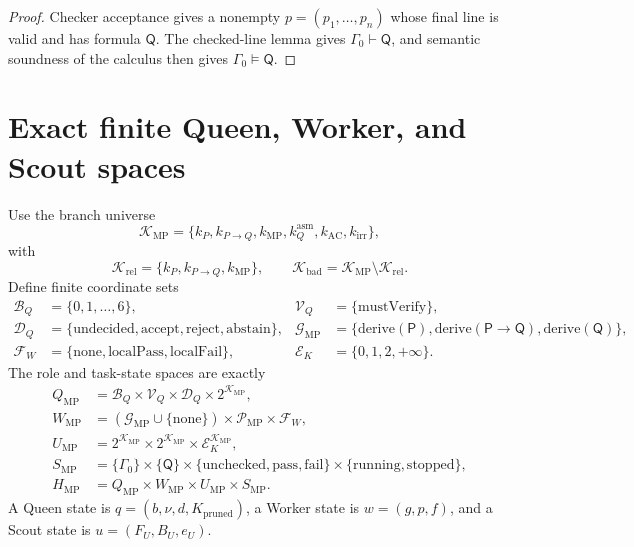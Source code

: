 \documentclass[11pt,oneside]{book}
\theoremstyle{remark}
\begin{document}
\begin{proof}
Checker acceptance gives a nonempty $p=(p_1,\ldots,p_n)$ whose final line is
valid and has formula $\mathsf Q$. The checked-line lemma gives
$\Gamma_0\vdash\mathsf Q$, and semantic soundness of the calculus then gives
$\Gamma_0\models\mathsf Q$.
\end{proof}

\section{Exact finite Queen, Worker, and Scout spaces}

Use the branch universe
\[
\mathcal K_{\mathrm{MP}}
=\{k_P,k_{P\to Q},k_{\mathrm{MP}},
k_Q^{\mathrm{asm}},k_{\mathrm{AC}},k_{\mathrm{irr}}\},
\]
with
\[
\mathcal K_{\mathrm{rel}}=\{k_P,k_{P\to Q},k_{\mathrm{MP}}\},
\qquad
\mathcal K_{\mathrm{bad}}
=\mathcal K_{\mathrm{MP}}\setminus\mathcal K_{\mathrm{rel}}.
\]
Define finite coordinate sets
\begin{align*}
\mathcal B_Q&=\{0,1,\ldots,6\},&
\mathcal V_Q&=\{\mathrm{mustVerify}\},\\
\mathcal D_Q&=\{\mathrm{undecided},\mathrm{accept},
\mathrm{reject},\mathrm{abstain}\},&
\mathcal G_{\mathrm{MP}}&=\{
\mathrm{derive}(\mathsf P),
\mathrm{derive}(\mathsf P\to\mathsf Q),
\mathrm{derive}(\mathsf Q)\},\\
\mathcal F_W&=\{\mathrm{none},\mathrm{localPass},\mathrm{localFail}\},&
\mathcal E_K&=\{0,1,2,+\infty\}.
\end{align*}
The role and task-state spaces are exactly
\begin{align*}
Q_{\mathrm{MP}}
&=\mathcal B_Q\times\mathcal V_Q\times\mathcal D_Q
\times2^{\mathcal K_{\mathrm{MP}}},\\
W_{\mathrm{MP}}
&=(\mathcal G_{\mathrm{MP}}\cup\{\mathrm{none}\})
\times\mathcal P_{\mathrm{MP}}\times\mathcal F_W,\\
U_{\mathrm{MP}}
&=2^{\mathcal K_{\mathrm{MP}}}
\times2^{\mathcal K_{\mathrm{MP}}}
\times\mathcal E_K^{\mathcal K_{\mathrm{MP}}},\\
S_{\mathrm{MP}}
&=\{\Gamma_0\}\times\{\mathsf Q\}
\times\{\mathrm{unchecked},\mathrm{pass},\mathrm{fail}\}
\times\{\mathrm{running},\mathrm{stopped}\},\\
H_{\mathrm{MP}}&=Q_{\mathrm{MP}}\times W_{\mathrm{MP}}
\times U_{\mathrm{MP}}\times S_{\mathrm{MP}}.
\end{align*}
A Queen state is $q=(b,\nu,d,K_{\mathrm{pruned}})$, a Worker state is
$w=(g,p,f)$, and a Scout state is $u=(F_U,B_U,e_U)$.
\end{document}
